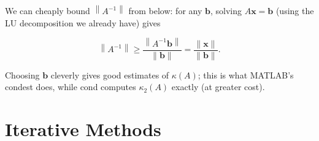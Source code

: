 \begin{theorem}[Bounding \(A^{-1}\)]
  
We can cheaply bound \(\left\|A^{-1}\right\|\) from below: for any \(\mathbf{b}\), solving \(A \mathbf{x}=\mathbf{b}\) (using the LU decomposition we already have) gives

\[
\left\|A^{-1}\right\| \geq \frac{\left\|A^{-1} \mathbf{b}\right\|}{\|\mathbf{b}\|}=\frac{\|\mathbf{x}\|}{\|\mathbf{b}\|} .
\]

Choosing \(\mathbf{b}\) cleverly gives good estimates of \(\kappa(A)\); this is what MATLAB's condest does, while cond computes \(\kappa_2(A)\) exactly (at greater cost).

\end{theorem}

\section{Iterative Methods}


